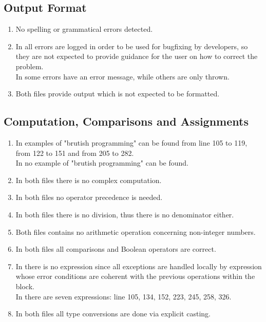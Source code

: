 \subsection{Output Format}
\begin{enumerate}[NUM]
    \item No spelling or grammatical errors detected.
    
    \item In  all errors are logged in order to be used for bugfixing by developers, so they are not expected to provide guidance for the user on how to correct the problem.\\
    In  some errors have an error message, while others are only thrown.
    
    \item Both files provide output which is not expected to be formatted.
\end{enumerate}

\subsection{Computation, Comparisons and Assignments}
\begin{enumerate}[NUM]
    \item In  examples of "brutish programming" can be found from line 105 to 119, from 122 to 151 and from 205 to 282.\\
    In  no example of "brutish programming" can be found.
    
    \item In both files there is no complex computation.
    
    \item In both files no operator precedence is needed.
    
    \item In both files there is no division, thus there is no denominator either.
    
    \item Both files contains no arithmetic operation concerning non-integer numbers.
    
    
    \item In both files all comparisons and Boolean operators are correct.
    
    \item In  there is no  expression since all exceptions are handled locally by  expression whose error conditions are coherent with the previous operations within the  block.\\
    In  there are seven  expressions: line 105, 134, 152, 223, 245, 258, 326.
    
    \item In both files all type conversions are done via explicit casting.
\end{enumerate}

